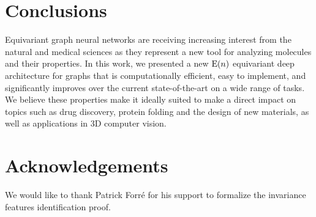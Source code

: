 \section{Conclusions}
Equivariant graph neural networks are receiving increasing interest from the natural and medical sciences as they represent a new tool for analyzing molecules and their properties. In this work, we presented a new $\mathrm{E}(n)$ equivariant deep architecture for graphs that is computationally efficient, easy to implement, and significantly improves over the current state-of-the-art on a wide range of tasks. We believe these properties make it ideally suited to make a direct impact on topics such as drug discovery, protein folding and the design of new materials, as well as applications in 3D computer vision.

\section*{Acknowledgements}
We would like to thank Patrick Forr\'e for his support to formalize the invariance features identification proof. 



